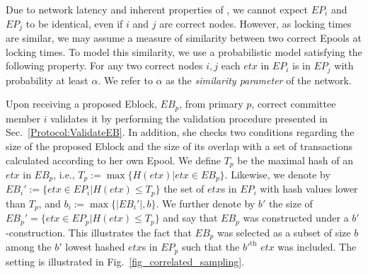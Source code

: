 
Due to network latency and inherent properties of \nameNS, we cannot expect $EP_i$ and $EP_j$ to be identical, even if $i$ and $j$ are correct nodes. However, as locking times are similar, we may assume a measure of similarity between two correct Epools at locking times.
To model this similarity, we use a probabilistic model satisfying the following property. For any two correct nodes $i,j$ each $etx$ in $EP_i$ is in $EP_j$ with probability at least $\alpha$. We refer to $\alpha$ as the \emph{similarity parameter} of the network.


Upon receiving a proposed Eblock, $EB_p$, from primary $p$, correct committee member $i$ validates it by performing the validation procedure presented in Sec.~\ref{Protocol:ValidateEB}. In addition, she checks two conditions regarding the size of the proposed Eblock and the size of its overlap with a set of transactions calculated according to her own Epool. 
We define $T_p$ be the maximal hash of an $etx$ in $EB_p$, i.e., $T_p:=\max\{H(etx)\vert etx\in EB_p\}$. Likewise, we denote by $EB_i' :=\{etx\in EP_i|H(etx)\leq T_p\}$ the set of $etx$s in $EP_i$ with hash values lower than $T_p$, and $b_i:=\max\{|EB_i'|,b\}$. We further denote by $b'$ the size of $EB_p'=\{etx\in EP_p|H(etx)\leq T_p\}$ and say that $EB_p$ was constructed under a $b'$-construction. 
This illustrates the fact that $EB_p$ was selected as a subset of size $b$ among the $b'$ lowest hashed $etx$s in $EP_p$ such that the $b'^{\text{th}}$ $etx$ was included. The setting is illustrated in Fig.~\ref{fig_correlated_sampling}.


